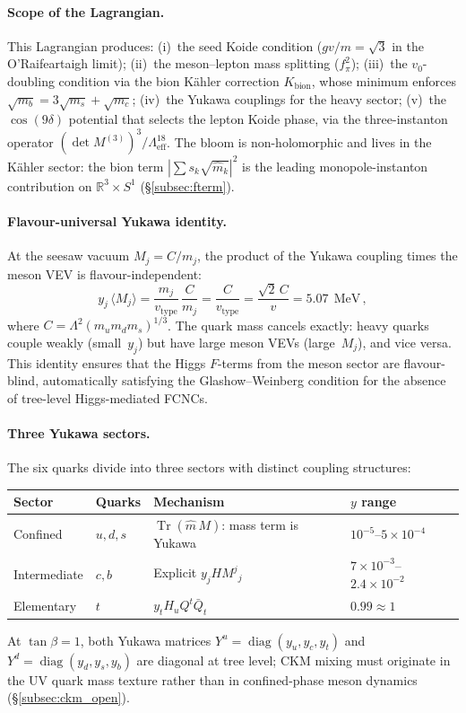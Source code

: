 \documentclass[12pt,a4paper]{article}
\newcommand{\MeV}{\,\text{MeV}}
\newcommand{\fpi}{f_\pi}
\begin{document}
\paragraph{Scope of the Lagrangian.}
This Lagrangian produces: (i)~the seed Koide condition ($gv/m = \sqrt{3}$
in the O'Raifeartaigh limit); (ii)~the meson--lepton mass splitting
($\fpi^2$); (iii)~the $v_0$-doubling condition via the bion K\"ahler
correction $K_{\text{bion}}$, whose minimum enforces
$\sqrt{m_b} = 3\sqrt{m_s} + \sqrt{m_c}$; (iv)~the Yukawa couplings for
the heavy sector; (v)~the $\cos(9\delta)$ potential that selects
the lepton Koide phase, via the three-instanton operator
$(\det M^{(3)})^3/\Lambda_{\text{eff}}^{18}$. The bloom is
non-holomorphic and lives in the K\"ahler sector: the bion term
$|\sum s_k\sqrt{\hat m_k}|^2$ is the leading monopole-instanton
contribution on $\mathbb{R}^3 \times S^1$
(\S\ref{subsec:fterm}).

\paragraph{Flavour-universal Yukawa identity.}
At the seesaw vacuum $M_j = C/m_j$, the product of the Yukawa
coupling times the meson VEV is flavour-independent:
\[
  y_j\,\langle M_j\rangle
  = \frac{m_j}{v_{\text{type}}}\,\frac{C}{m_j}
  = \frac{C}{v_{\text{type}}}
  = \frac{\sqrt{2}\,C}{v}
  = 5.07\;\MeV\,,
\]
where $C = \Lambda^2(m_u m_d m_s)^{1/3}$.
The quark mass cancels exactly: heavy quarks couple weakly
(small~$y_j$) but have large meson VEVs (large~$M_j$), and
vice versa.
This identity ensures that the Higgs $F$-terms from the meson
sector are flavour-blind, automatically satisfying the
Glashow--Weinberg condition for the absence of tree-level
Higgs-mediated FCNCs.

\paragraph{Three Yukawa sectors.}
The six quarks divide into three sectors with distinct coupling
structures:
\begin{center}
\small
\begin{tabular}{llll}
\toprule
Sector & Quarks & Mechanism & $y$ range \\
\midrule
Confined & $u,d,s$ & $\operatorname{Tr}(\hat m\,M)$: mass
  term is Yukawa & $10^{-5}$--$5\times 10^{-4}$ \\
Intermediate & $c,b$ & Explicit $y_j H M^j{}_j$ & $7\times 10^{-3}$--$2.4\times 10^{-2}$ \\
Elementary & $t$ & $y_t H_u Q^t\bar Q_t$ & $0.99 \approx 1$ \\
\bottomrule
\end{tabular}
\end{center}
At $\tan\beta = 1$, both Yukawa matrices
$Y^u = \operatorname{diag}(y_u,y_c,y_t)$ and
$Y^d = \operatorname{diag}(y_d,y_s,y_b)$ are diagonal at
tree level; CKM mixing must originate in the UV quark mass
texture rather than in confined-phase meson dynamics
(\S\ref{subsec:ckm_open}).
\end{document}

